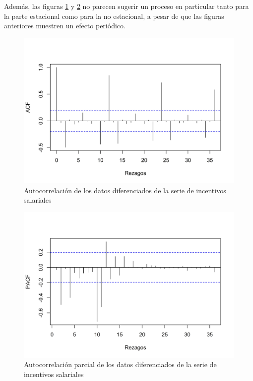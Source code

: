 \documentclass[
]{article}
\begin{document}
Además, las figuras \ref{fig:incentivos_acf} y \ref{fig:incentivos_pacf}
no parecen sugerir un proceso en particular tanto para la parte
estacional como para la no estacional, a pesar de que las figuras
anteriores muestren un efecto periódico.

\begin{figure}[H]
\includegraphics[width=1\linewidth,height=1\textheight]{Tesis_files/figure-latex/incentivos_acf-1} \caption{Autocorrelación de los datos diferenciados de la serie de incentivos salariales}\label{fig:incentivos_acf}
\end{figure}

\begin{figure}[H]
\includegraphics[width=1\linewidth,height=1\textheight]{Tesis_files/figure-latex/incentivos_pacf-1} \caption{Autocorrelación parcial de los datos diferenciados de la serie de incentivos salariales}\label{fig:incentivos_pacf}
\end{figure}
\end{document}
